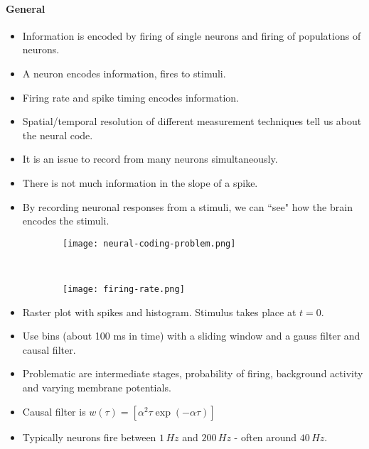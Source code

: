 \documentclass[main]{subfiles}
\begin{document}
\paragraph{General}

\begin{itemize}[noitemsep,nolistsep]
	\item Information is encoded by firing of single neurons and firing of populations of neurons.
	\item A neuron encodes information, fires to stimuli.
	\item Firing rate and spike timing encodes information.
	\item Spatial/temporal resolution of different measurement techniques tell us about the neural code.
	\item It is an issue to record from many neurons simultaneously.
	\item There is not much information in the slope of a spike.
	\item By recording neuronal responses from a stimuli, we can ``see" how the brain encodes the stimuli.
\end{itemize}

\begin{figure}[H]
	\centering
	\begin{subfigure}[b]{0.5\textwidth}
		\centering
		\texttt{[image: neural-coding-problem.png]}
	\end{subfigure}%
	~
	\begin{subfigure}[b]{0.5\textwidth}
		\centering
		\texttt{[image: firing-rate.png]}
	\end{subfigure}
\end{figure}

\begin{itemize}[noitemsep,nolistsep]
	\item Raster plot with spikes and histogram. Stimulus takes place at $t = 0$.
	\item Use bins (about 100 ms in time) with a sliding window and a gauss filter and causal filter.
	\item Problematic are intermediate stages, probability of firing, background activity and varying membrane potentials.
	\item Causal filter is $w(\tau) = [\alpha^2\tau\exp(-\alpha\tau)]$
	\item Typically neurons fire between $1\,Hz$ and $200\,Hz$ - often around $40\,Hz$.
\end{itemize}
\end{document}
